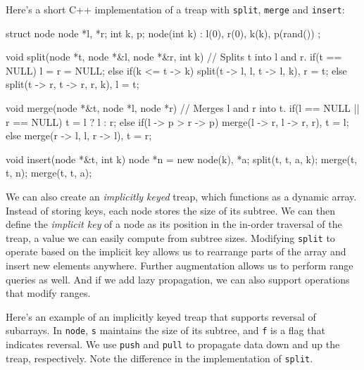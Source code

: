 Here's a short C++ implementation of a treap with \texttt{split}, \texttt{merge} and \texttt{insert}:

\begin{mylstlisting}[language=C++]
struct node {
  node *l, *r;
  int k, p;
  node(int k) : l(0), r(0), k(k), p(rand()) {}
};

void split(node *t, node *&l, node *&r, int k){
  // Splits t into l and r.
  if(t == NULL) l = r = NULL;
  else if(k <= t -> k) split(t -> l, l, t -> l, k), r = t;
  else split(t -> r, t -> r, r, k), l = t;
}

void merge(node *&t, node *l, node *r){
  // Merges l and r into t.
  if(l == NULL || r == NULL) t = l ? l : r;
  else if(l -> p > r -> p) merge(l -> r, l -> r, r), t = l;
  else merge(r -> l, l, r -> l), t = r;
}

void insert(node *&t, int k){
  node *n = new node(k), *a;
  split(t, t, a, k);
  merge(t, t, n);
  merge(t, t, a);
}
\end{mylstlisting}

We can also create an \emph{implicitly keyed} treap, which functions as a dynamic array. Instead of storing keys, each node stores the size of its subtree. We can then define the \emph{implicit key} of a node as its position in the in-order traversal of the treap, a value we can easily compute from subtree sizes. Modifying \texttt{split} to operate based on the implicit key allows us to rearrange parts of the array and insert new elements anywhere. Further augmentation allows us to perform range queries as well. And if we add lazy propagation, we can also support operations that modify ranges.

Here's an example of an implicitly keyed treap that supports reversal of subarrays. In \texttt{node}, \texttt{s} maintains the size of its subtree, and \texttt{f} is a flag that indicates reversal. We use \texttt{push} and \texttt{pull} to propagate data down and up the treap, respectively. Note the difference in the implementation of \texttt{split}.

